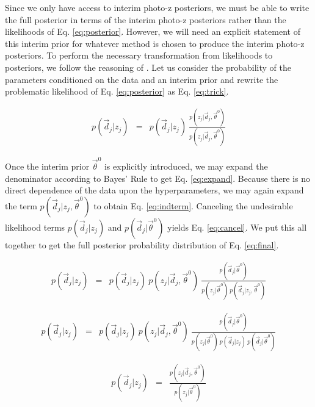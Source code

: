 \documentclass[preprint]{aastex}
\begin{document}
Since we only have access to interim photo-z posteriors, we must be able to 
write the full posterior in terms of the interim photo-z posteriors rather than 
the likelihoods of Eq. \ref{eq:posterior}.  However, we will need an explicit 
statement of this interim prior for whatever method is chosen to produce the 
interim photo-z posteriors.  To perform the necessary transformation from 
likelihoods to posteriors, we follow the reasoning of \citet{Marshall2015}.  
Let us consider the probability of the parameters conditioned on the data and 
an interim prior and rewrite the problematic likelihood of Eq. 
\ref{eq:posterior} as Eq. \ref{eq:trick}.  

\begin{eqnarray}
\label{eq:trick}
p(\vec{d}_{j}|z_{j}) &=& p(\vec{d}_{j}|z_{j})\ 
\frac{p(z_{j}|\vec{d}_{j},\vec{\theta}^{0})}{p(z_{j}|\vec{d}_{j},\vec{\theta}^{0
})}
\end{eqnarray}

Once the interim prior $\vec{\theta}^{0}$ is explicitly introduced, we may 
expand the denominator according to Bayes' Rule to get Eq. \ref{eq:expand}.  
Because there is no direct dependence of the data upon the hyperparameters, we 
may again expand the term $p(\vec{d}_{j}|z_{j},\vec{\theta}^{0})$ to obtain Eq. 
\ref{eq:indterm}.  Canceling the undesirable likelihood terms 
$p(\vec{d}_{j}|z_{j})$ and $p(\vec{d}_{j}|\vec{\theta}^{0})$ yields Eq. 
\ref{eq:cancel}.  We put this all together to get the full posterior 
probability distribution of Eq. \ref{eq:final}.

\begin{eqnarray}
\label{eq:expand}
p(\vec{d}_{j}|z_{j}) &=& p(\vec{d}_{j}|z_{j})\ 
p(z_{j}|\vec{d}_{j},\vec{\theta}^{0})\ 
\frac{p(\vec{d}_{j}|\vec{\theta}^{0})}{p(z_{j}|\vec{\theta}^{0})\ 
p(\vec{d}_{j}|z_{j},\vec{\theta}^{0})}
\end{eqnarray}

\begin{eqnarray}
\label{eq:indterm}
p(\vec{d}_{j}|z_{j}) &=& p(\vec{d}_{j}|z_{j})\ 
p(z_{j}|\vec{d}_{j},\vec{\theta}^{0})\ 
\frac{p(\vec{d}_{j}|\vec{\theta}^{0})}{p(z_{j}|\vec{\theta}^{0})\ 
p(\vec{d}_{j}|z_{j})\ p(\vec{d}_{j}|\vec{\theta}^{0})}
\end{eqnarray}

\begin{eqnarray}
\label{eq:cancel}
p(\vec{d}_{j}|z_{j}) &=& 
\frac{p(z_{j}|\vec{d}_{j},\vec{\theta}^{0})}{p(z_{j}|\vec{\theta}^{0})}
\end{eqnarray}
\end{document}
